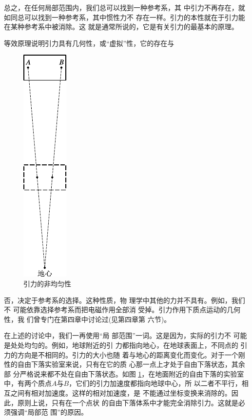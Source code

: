 总之，在任何局部范围内，我们总可以找到一种参考系，其
中引力不再存在，就如同总可以找到一种参考系，其中惯性力不
存在一样。引力的本性就在于引力能在某种参考系中被消除。这
就是通常所说的，它是有关引力的最基本的原理。

等效原理说明引力具有几何性，或“虚拟”性，它的存在与
\begin{figure}
    \centering
    \includegraphics{figure/fig12.13}
    \caption{引力的非均匀性}
    \label{fig:12.13}
\end{figure}
否，决定于参考系的选择。这种性质，物
理学中其他的力并不具有。例如，我们不
可能依靠选择参考系而把电磁作用全部消
受掉。引力作用下质点运动的几何性，我
们曾专门在第四章中讨论过(见第四章第
六节)。

在上述的讨论中，我们一再使用“局
部范围”一词。这是因为，实际的引力不
可能是处处均匀的。例如，地球附近的引
力都指向地心，在地球表面上，不同点的
引力的方向是不相同的。引力的大小也随
着与地心的距离变化而变化。对于一个刚
性的自由下落实验室来说，只有在它的质
心那一点上才处于自由下落状态，其余部
分严格说来都不处在自由下落状态。如图
\ref{fig:12.13}，在地面附近的自由下落的实验室
中，有两个质点$ A $与$ B $，它们的引力加速度都指向地球中心，所
以二者不平行，相互之间有相对加速度。这样的相对加速度，是
不能通过坐标变换来消除的。因此，原则上说，只有在一个点状
的自由下落体系中才能完全消除引力。这就是必须强调“局部范
围”的原因。
